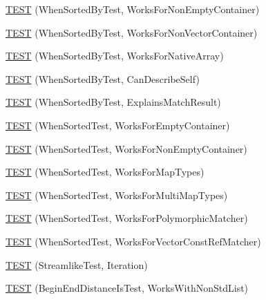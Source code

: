 \begin{DoxyCompactItemize}
\item 
\mbox{\hyperlink{namespacetesting_1_1gmock__matchers__test_a3095e5533ec12a67377dec6b0769d9a8}{T\+E\+ST}} (When\+Sorted\+By\+Test, Works\+For\+Non\+Empty\+Container)
\item 
\mbox{\hyperlink{namespacetesting_1_1gmock__matchers__test_a24d3caacabfef918b7a5b9dacc5e3a66}{T\+E\+ST}} (When\+Sorted\+By\+Test, Works\+For\+Non\+Vector\+Container)
\item 
\mbox{\hyperlink{namespacetesting_1_1gmock__matchers__test_a33b65fc6db83270b5c29073dbbf69c4e}{T\+E\+ST}} (When\+Sorted\+By\+Test, Works\+For\+Native\+Array)
\item 
\mbox{\hyperlink{namespacetesting_1_1gmock__matchers__test_afc2d1e86837d8e3103748cb2e96b61c3}{T\+E\+ST}} (When\+Sorted\+By\+Test, Can\+Describe\+Self)
\item 
\mbox{\hyperlink{namespacetesting_1_1gmock__matchers__test_ada0850ab21beccb47802aab36c06d163}{T\+E\+ST}} (When\+Sorted\+By\+Test, Explains\+Match\+Result)
\item 
\mbox{\hyperlink{namespacetesting_1_1gmock__matchers__test_a76aaffd49c78fdee18f11fae5ea3f6fb}{T\+E\+ST}} (When\+Sorted\+Test, Works\+For\+Empty\+Container)
\item 
\mbox{\hyperlink{namespacetesting_1_1gmock__matchers__test_a2bfbef7e777d319e3d96fc98340bb558}{T\+E\+ST}} (When\+Sorted\+Test, Works\+For\+Non\+Empty\+Container)
\item 
\mbox{\hyperlink{namespacetesting_1_1gmock__matchers__test_acc4a96f3aa369fda8f554f5ac4495f4b}{T\+E\+ST}} (When\+Sorted\+Test, Works\+For\+Map\+Types)
\item 
\mbox{\hyperlink{namespacetesting_1_1gmock__matchers__test_ab5de36ad02781be67163ae24d08b5454}{T\+E\+ST}} (When\+Sorted\+Test, Works\+For\+Multi\+Map\+Types)
\item 
\mbox{\hyperlink{namespacetesting_1_1gmock__matchers__test_a587c3799433426782ccdcfe5cb07f5bc}{T\+E\+ST}} (When\+Sorted\+Test, Works\+For\+Polymorphic\+Matcher)
\item 
\mbox{\hyperlink{namespacetesting_1_1gmock__matchers__test_a0975bae51ce06a819dc1437134fd7f05}{T\+E\+ST}} (When\+Sorted\+Test, Works\+For\+Vector\+Const\+Ref\+Matcher)
\item 
\mbox{\hyperlink{namespacetesting_1_1gmock__matchers__test_a5aa4eed927d4a1a8ea306d5e47dce94f}{T\+E\+ST}} (Streamlike\+Test, Iteration)
\item 
\mbox{\hyperlink{namespacetesting_1_1gmock__matchers__test_add74820690e798ae8a365d08b68ddf71}{T\+E\+ST}} (Begin\+End\+Distance\+Is\+Test, Works\+With\+Non\+Std\+List)

\end{DoxyCompactItemize}
